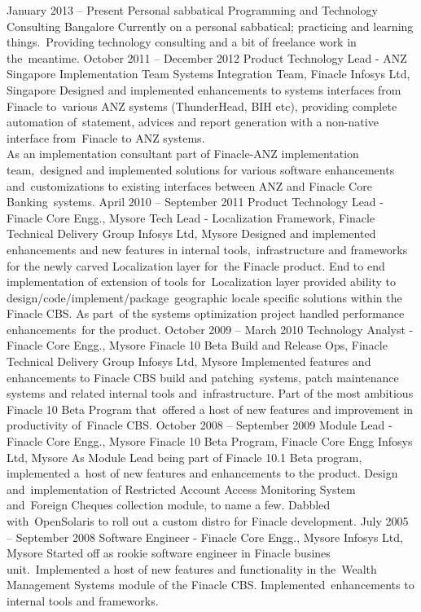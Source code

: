\documentclass[11pt,a4paper,sans]{moderncv}
\begin{document}
\cventry
{January 2013 -- Present}
{Personal sabbatical}
{Programming and Technology Consulting}
{Bangalore}
{}
{Currently on a personal sabbatical; practicing and learning things.\
Providing technology consulting and a bit of freelance work in the\
meantime. \newline{}}
\cventry
{October 2011 -- December 2012}
{Product Technology Lead - ANZ Singapore Implementation Team}
{Systems Integration Team, Finacle}
{Infosys Ltd, Singapore}
{} %
{Designed and implemented enhancements to systems interfaces from Finacle to\
various ANZ systems (ThunderHead, BIH etc), providing complete automation of\
statement, advices and report generation with a non-native interface from\
Finacle to ANZ systems. \\
As an implementation consultant part of Finacle-ANZ implementation team,\
designed and implemented solutions for various software enhancements and\
customizations to existing interfaces between ANZ and Finacle Core Banking\
systems. \newline{}}
\cventry
{April 2010 -- September 2011}
{Product Technology Lead - Finacle Core Engg., Mysore}
{Tech Lead - Localization Framework, Finacle Technical Delivery Group}
{Infosys Ltd, Mysore}
{}
{Designed and implemented enhancements and new features in internal tools,\
infrastructure and frameworks for the newly carved Localization layer for\
the Finacle product. End to end implementation of extension of tools for\
Localization layer provided ability to design/code/implement/package\
geographic locale specific solutions within the Finacle CBS. As part\
of the systems optimization project handled performance enhancements\
for the product. \newline{}}
\cventry
{October 2009 -- March 2010}
{Technology Analyst - Finacle Core Engg., Mysore}
{Finacle 10 Beta Build and Release Ops, Finacle Technical Delivery Group}
{Infosys Ltd, Mysore}
{}
{Implemented features and enhancements to Finacle CBS build and patching\
systems, patch maintenance systems and related internal tools and\
infrastructure. Part of the most ambitious Finacle 10 Beta Program that\
offered a host of new features and improvement in productivity of\
Finacle CBS. \newline{}}
\cventry
{October 2008 -- September 2009}
{Module Lead - Finacle Core Engg., Mysore}
{Finacle 10 Beta Program, Finacle Core Engg}
{Infosys Ltd, Mysore}
{}
{As Module Lead being part of Finacle 10.1 Beta program, implemented a\
host of new features and enhancements to the product. Design and\
implementation of Restricted Account Access Monitoring System and\
Foreign Cheques collection module, to name a few. Dabbled with\
OpenSolaris to roll out a custom distro for Finacle development.\newline{}}
\cventry
{July 2005 -- September 2008}
{Software Engineer - Finacle Core Engg., Mysore}
{}
{Infosys Ltd, Mysore}
{}
{Started off as rookie software engineer in Finacle busines unit.\
Implemented a host of new features and functionality in the\
Wealth Management Systems module of the Finacle CBS. Implemented\
enhancements to internal tools and frameworks.\newline{} }
\end{document}
